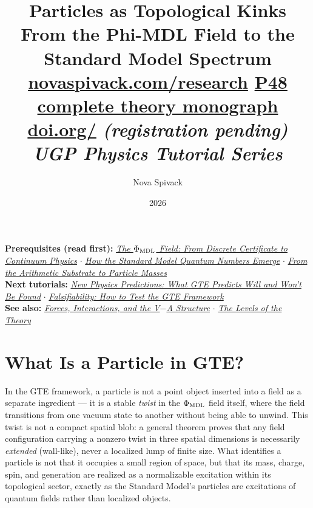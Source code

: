 \documentclass[11pt,a4paper]{article}
\date{2026}
\title{\textbf{Particles as Topological Kinks}\\[6pt]
\large From the Phi-MDL Field to the Standard Model Spectrum\\[8pt]
\normalsize
\href{https://novaspivack.com/research}{novaspivack.com/research}\texorpdfstring{\quad}{ }
\href{https://doi.org/10.5281/zenodo.20560550}{P48 complete theory monograph}\\[4pt]
\small\href{https://doi.org/\TutorialDOI}{doi.org/\TutorialDOI}
  \textit{(registration pending)}\\[4pt]
\normalsize\textit{UGP Physics Tutorial Series}}
\author{Nova Spivack}
\begin{document}
\setcounter{tocdepth}{2}
\maketitle
\tableofcontents
\newpage

\begin{tcolorbox}[colback=blue!6,colframe=blue!40!black,
  title=\textbf{UGP Physics Tutorial Series}]
\textbf{Prerequisites (read first):}
  \href{https://doi.org/10.5281/zenodo.20657885}%
    {\emph{The $\Phi_{\rm MDL}$ Field: From Discrete Certificate to Continuum Physics}}
  $\cdot$
  \href{https://doi.org/10.5281/zenodo.20657898}%
    {\emph{How the Standard Model Quantum Numbers Emerge}}
  $\cdot$
  \href{https://doi.org/10.5281/zenodo.20657913}%
    {\emph{From the Arithmetic Substrate to Particle Masses}}\\[4pt]
\textbf{Next tutorials:}
  \href{https://doi.org/10.5281/zenodo.20669152}%
    {\emph{New Physics Predictions: What GTE Predicts Will and Won't Be Found}}
  $\cdot$
  \href{https://doi.org/10.5281/zenodo.20669142}%
    {\emph{Falsifiability: How to Test the GTE Framework}}\\[4pt]
\textbf{See also:}
  \href{https://doi.org/10.5281/zenodo.20669144}%
    {\emph{Forces, Interactions, and the V$-$A Structure}}
  $\cdot$
  \href{https://doi.org/10.5281/zenodo.20657872}%
    {\emph{The Levels of the Theory}}
\end{tcolorbox}


\section{What Is a Particle in GTE?}
\label{sec:what_is_particle}

\begin{tcolorbox}[colback=boxblue,colframe=blue!40!black,
  title=The one-sentence answer]
In the GTE framework, a particle is not a point object inserted into a field as
a separate ingredient — it is a stable \emph{twist} in the $\Phi_{\rm MDL}$ field
itself, where the field transitions from one vacuum state to another without
being able to unwind.  This twist is not a compact spatial blob: a general
theorem proves that any field configuration carrying a nonzero twist in three
spatial dimensions is necessarily \emph{extended} (wall-like), never a localized
lump of finite size.  What identifies a particle is not that it occupies a small
region of space, but that its mass, charge, spin, and generation are realized as
a normalizable excitation within its topological sector, exactly as the Standard
Model's particles are excitations of quantum fields rather than localized objects.
\end{tcolorbox}
\end{document}
